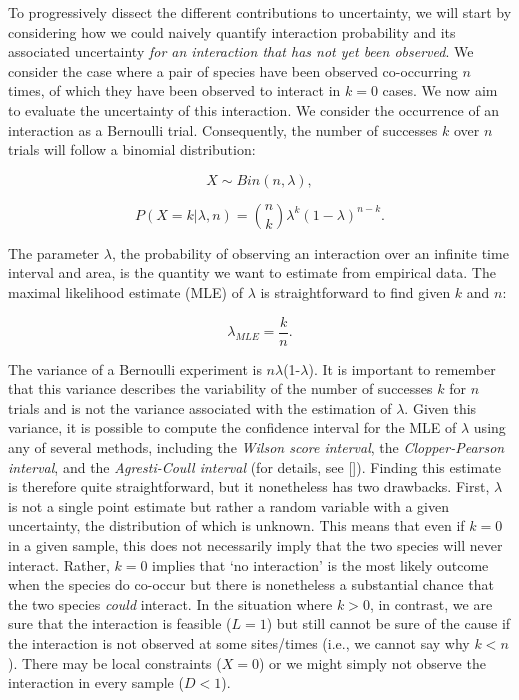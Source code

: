 \documentclass[12pt]{article}
\begin{document}
\begin{spacing}{2.0}
  To progressively dissect the different contributions to uncertainty, we will start by considering how we could naively quantify interaction probability and its associated uncertainty \emph{for an interaction that has not yet been observed}. We consider the case where a pair of species have been observed co-occurring $n$ times, of which they have been observed to interact in $k = 0$ cases. We now aim to evaluate the uncertainty of this interaction. We consider the occurrence of an interaction as a Bernoulli trial. Consequently, the number of successes $k$ over $n$ trials will follow a binomial distribution: 
      
      \begin{equation}
        X \sim Bin(n,\lambda) ,
      \end{equation}


      \begin{equation}
         P(X = k|\lambda,n) = {n \choose k}\lambda^k(1-\lambda)^{n-k} . 
         \label{likelihood}
      \end{equation}

  \noindent The parameter $\lambda$, the probability of observing an interaction over an infinite time interval and area, is the quantity we want to estimate from empirical data. 
  The maximal likelihood estimate (MLE) of $\lambda$ is straightforward to find given $k$ and $n$:

      \begin{equation}
        \lambda_{MLE} = \frac{k}{n}  .
        \label{theta_MLE}
      \end{equation}

  The variance of a Bernoulli experiment is $n\lambda$(1-$\lambda$). It is important to remember that this variance describes the variability of the number of successes $k$ for $n$ trials and is not the variance associated with the estimation of $\lambda$. Given this variance, it is possible to compute the confidence interval for the MLE of $\lambda$ using any of several methods, including the \emph{Wilson score interval}, the \emph{Clopper-Pearson interval}, and the \emph{Agresti-Coull interval} (for details, see [\citealp{Brown2001}]). Finding this estimate is therefore quite straightforward, but it nonetheless has two drawbacks. First, $\lambda$ is not a single point estimate but rather a random variable with a given uncertainty, the distribution of which is unknown. This means that even if $k = 0$ in a given sample, this does not necessarily imply that the two species will never interact. Rather, $k = 0$ implies that `no interaction' is the most likely outcome when the species do co-occur but there is nonetheless a substantial chance that the two species \emph{could} interact. In the situation where $k>0$, in contrast, we are sure that the interaction is feasible ($L = 1$) but still cannot be sure of the cause if the interaction is not observed at some sites/times (i.e., we cannot say why $k<n$). There may be local constraints ($X=0$) or we might simply not observe the interaction in every sample ($D<1$). 



\end{spacing}
\end{document}
